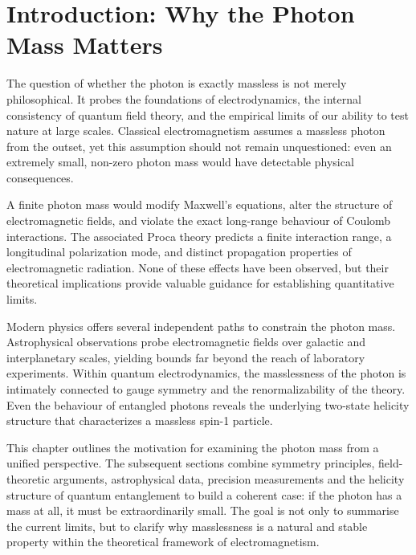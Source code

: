 \section{Introduction: Why the Photon Mass Matters}


The question of whether the photon is exactly massless is not merely 
philosophical. It probes the foundations of electrodynamics, the internal 
consistency of quantum field theory, and the empirical limits of our 
ability to test nature at large scales. Classical electromagnetism assumes 
a massless photon from the outset, yet this assumption should not remain 
unquestioned: even an extremely small, non-zero photon mass would have 
detectable physical consequences.

A finite photon mass would modify Maxwell’s equations, alter the structure 
of electromagnetic fields, and violate the exact long-range behaviour of 
Coulomb interactions. The associated Proca theory predicts a finite 
interaction range, a longitudinal polarization mode, and distinct 
propagation properties of electromagnetic radiation. None of these effects 
have been observed, but their theoretical implications provide valuable 
guidance for establishing quantitative limits.

Modern physics offers several independent paths to constrain the photon 
mass. Astrophysical observations probe electromagnetic fields over 
galactic and interplanetary scales, yielding bounds far beyond the reach 
of laboratory experiments. Within quantum electrodynamics, the masslessness 
of the photon is intimately connected to gauge symmetry and the 
renormalizability of the theory. Even the behaviour of entangled photons 
reveals the underlying two-state helicity structure that characterizes a 
massless spin-1 particle.

This chapter outlines the motivation for examining the photon mass from a 
unified perspective. The subsequent sections combine symmetry principles, 
field-theoretic arguments, astrophysical data, precision measurements and 
the helicity structure of quantum entanglement to build a coherent case: 
if the photon has a mass at all, it must be extraordinarily small. The 
goal is not only to summarise the current limits, but to clarify why 
masslessness is a natural and stable property within the theoretical 
framework of electromagnetism.

